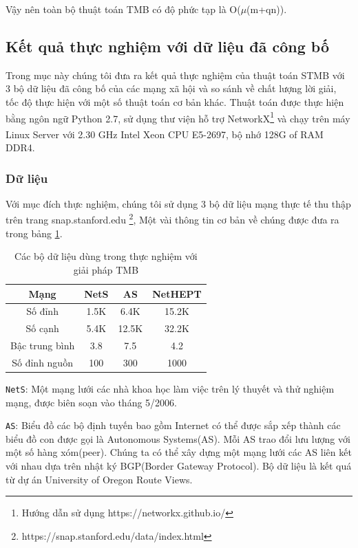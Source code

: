 Vậy nên toàn bộ thuật toán TMB có độ phức tạp là O($\mu$(m+qn)).

\subsection{Kết quả thực nghiệm với dữ liệu đã công bố}	

Trong mục này chúng tôi đưa ra kết quả thực nghiệm của thuật toán STMB với 3 bộ dữ liệu đã công bố của các mạng xã hội và so sánh về chất lượng lời giải, tốc độ thực hiện với một số thuật toán cơ bản khác.
Thuật toán được thực hiện bằng ngôn ngữ Python 2.7, sử dụng thư viện hỗ trợ NetworkX\footnote{Hướng dẫn sử dụng https://networkx.github.io/} và chạy trên máy Linux Server với 2.30 GHz Intel\textsuperscript{\textregistered} Xeon\textsuperscript{\textregistered} CPU E5-2697, bộ nhớ 128G of RAM DDR4.
\subsubsection{Dữ liệu}
Với mục đích thực nghiệm, chúng tôi sử dụng 3 bộ dữ liệu mạng thực tế thu thập trên trang snap.stanford.edu \footnote{https://snap.stanford.edu/data/index.html}, Một vài thông tin cơ bản về chúng được đưa ra trong bảng \ref{TMB:table}. 
\begin{table}[h]
	\centering
	\begin{tabular}{|c|c|c|c|}
		\hline 
		Mạng & NetS & AS & NetHEPT\\ 
		\hline 
		Số đỉnh & 1.5K & 6.4K & 15.2K \\ 
		\hline 
		Số cạnh & 5.4K & 12.5K & 32.2K\\ 
		\hline 
		Bậc trung bình & 3.8 & 7.5 & 4.2\\ 
		\hline 
		Số đỉnh nguồn & 100 & 300 & 1000\\ 
		\hline 
	\end{tabular} 
	\caption{Các bộ dữ liệu dùng trong thực nghiệm với giải pháp TMB}
	\label{TMB:table}
\end{table}

\texttt{NetS}\cite{NetS}: Một mạng lưới các nhà khoa học làm việc trên lý thuyết và thử nghiệm mạng, được biên soạn vào tháng 5/2006.

\texttt{AS}\cite{AS}: Biểu đồ các bộ định tuyến bao gồm Internet có thể được sắp xếp thành các biểu đồ con được gọi là Autonomous Systems(AS). Mỗi AS trao đổi lưu lượng với một số hàng xóm(peer). Chúng ta có thể xây dựng một mạng lưới các AS liên kết với nhau dựa trên nhật ký BGP(Border Gateway Protocol). Bộ dữ liệu là kết quá từ dự án University of Oregon Route Views. 

